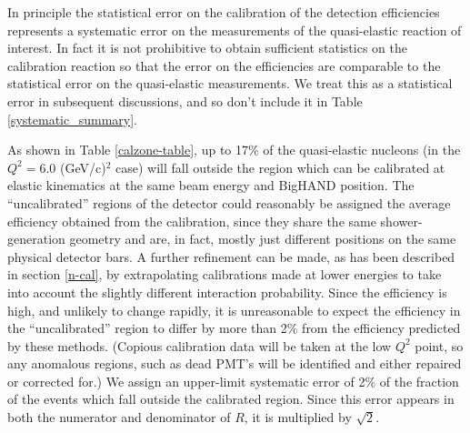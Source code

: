 \documentclass[12pt,letterpaper,oneside]{article}
\begin{document}
In principle the statistical error on the calibration of the detection
efficiencies represents a systematic error on the measurements of the
quasi-elastic reaction of interest.  In fact it is not prohibitive to
obtain sufficient statistics on the calibration reaction so that the
error on the efficiencies are comparable to the statistical error on
the quasi-elastic measurements.  We treat this as a statistical error
in subsequent discussions, and so don't include it in 
Table \ref{systematic_summary}.

As shown in Table \ref{calzone-table}, up to 17\% of the
quasi-elastic nucleons (in the $Q^2=6.0$ (GeV/c)$^2$ case) will fall
outside the region which can be calibrated at elastic kinematics at
the same beam energy and BigHAND position.  The ``uncalibrated'' regions
of the detector could reasonably be assigned the average efficiency
obtained from the calibration, since they share the same
shower-generation geometry and
are, in fact, mostly just different positions on the same physical
detector bars.  A further refinement can be made, as has been
described in section \ref{n-cal}, by extrapolating calibrations made
at lower energies to take into account the slightly different
interaction probability.  Since the efficiency is high, and unlikely
to change rapidly, it is unreasonable to expect the efficiency in
the ``uncalibrated'' region to differ by more than 2\% from the
efficiency predicted by these methods.
(Copious calibration data will
be taken at the low $Q^2$ point, so any anomalous regions, such as
dead PMT's will be identified and either repaired or corrected for.)
We assign an upper-limit systematic error of 2\% of the fraction of
the events which fall outside the calibrated region.  Since this error
appears in both the numerator and denominator of $R$, it is multiplied
by $\sqrt{2}$.

\end{document}
